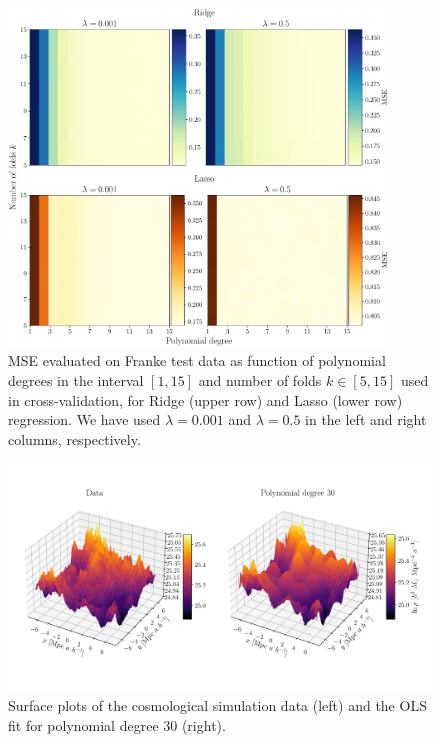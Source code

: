 \documentclass[aps,pra,english,notitlepage,reprint,nofootinbib]{revtex4-1}  %
\begin{document}
\begin{figure}
  \vspace*{-5pt}
  \centering %
  \includegraphics[width=0.9\textwidth]{../figs/f_Ridge_Lasso.pdf}
  \caption{MSE evaluated on Franke test data as function of polynomial degrees in the interval $[1, 15]$ and number of folds $k\in[5, 15]$ used in cross-validation, for Ridge (upper row) and Lasso (lower row) regression. We have used $\lambda=0.001$ and $\lambda=0.5$ in the left and right columns, respectively.}\label{appfig:f Ridge Lasso}
  \vspace*{-5pt}
\end{figure}


\begin{figure}
  \vspace*{-5pt}
  \centering %
  \includegraphics[width=\textwidth]{../figs/density_surf.pdf}
  \caption{Surface plots of the cosmological simulation data (left) and the OLS fit for polynomial degree 30 (right).}\label{appfig:density surf}
  \vspace*{-5pt}
\end{figure}
\end{document}
